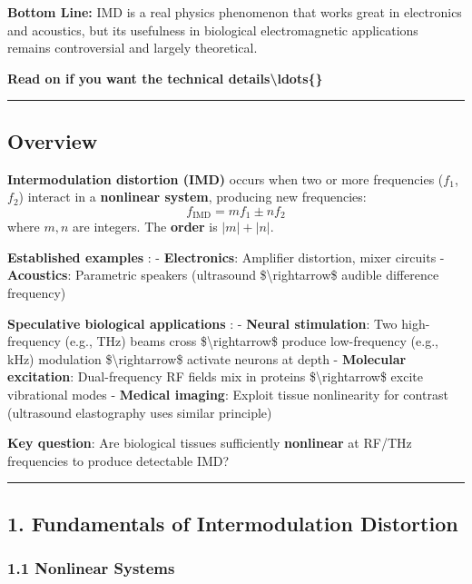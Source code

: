 \textbf{Bottom Line:} IMD is a real physics phenomenon that works great
in electronics and acoustics, but its usefulness in biological
electromagnetic applications remains controversial and largely
theoretical.

\textbf{Read on if you want the technical
details\textbackslash ldots\{\}}

\begin{center}\rule{0.5\linewidth}{0.5pt}\end{center}

\subsection{Overview}\label{overview}

\textbf{Intermodulation distortion (IMD)} occurs when two or more
frequencies (\(f_1\), \(f_2\)) interact in a \textbf{nonlinear system},
producing new frequencies: \[f_{\text{IMD}} = m f_1 \pm n f_2\] where
\(m, n\) are integers. The \textbf{order} is \(|m| + |n|\).

\textbf{Established examples} : - \textbf{Electronics}: Amplifier
distortion, mixer circuits - \textbf{Acoustics}: Parametric speakers
(ultrasound \$\textbackslash rightarrow\$ audible difference frequency)

\textbf{Speculative biological applications} : - \textbf{Neural
stimulation}: Two high-frequency (e.g., THz) beams cross
\$\textbackslash rightarrow\$ produce low-frequency (e.g., kHz)
modulation \$\textbackslash rightarrow\$ activate neurons at depth -
\textbf{Molecular excitation}: Dual-frequency RF fields mix in proteins
\$\textbackslash rightarrow\$ excite vibrational modes - \textbf{Medical
imaging}: Exploit tissue nonlinearity for contrast (ultrasound
elastography uses similar principle)

\textbf{Key question}: Are biological tissues sufficiently
\textbf{nonlinear} at RF/THz frequencies to produce detectable IMD?

\begin{center}\rule{0.5\linewidth}{0.5pt}\end{center}

\subsection{1. Fundamentals of Intermodulation
Distortion}\label{fundamentals-of-intermodulation-distortion}

\subsubsection{1.1 Nonlinear Systems}\label{nonlinear-systems}

